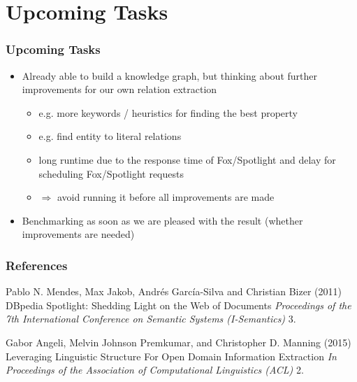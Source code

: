 \documentclass{beamer}
\begin{document}

\section{Upcoming Tasks}

\begin{frame}
\frametitle{Upcoming Tasks}
\begin{itemize}
	\item Already able to build a knowledge graph, but thinking about further improvements for our own relation extraction
	\begin{itemize}
		\item e.g. more keywords / heuristics for finding the best property
		\item e.g. find entity to literal relations 
		\item long runtime due to the response time of Fox/Spotlight and delay for scheduling Fox/Spotlight requests
		\item[] $\Rightarrow$ avoid running it before all improvements are made
	\end{itemize}
	\item Benchmarking as soon as we are pleased with the result (whether improvements are needed)
\end{itemize}
\end{frame}


\begin{frame}
\frametitle{References}
\footnotesize{
	\begin{thebibliography}{99} %
		 Pablo N. Mendes, Max Jakob, Andrés García-Silva and Christian Bizer (2011)
		\newblock DBpedia Spotlight: Shedding Light on the Web of
		Documents
		\newblock \emph{
			Proceedings of the 7th International Conference on Semantic Systems (I-Semantics) } 3.
	\end{thebibliography}
	\begin{thebibliography}{99} %
		 Gabor Angeli, Melvin Johnson Premkumar, and Christopher D. Manning (2015)
		\newblock Leveraging Linguistic Structure For Open Domain Information
		Extraction
		\newblock \emph{
			In Proceedings of the Association of Computational Linguistics (ACL) } 2.
	\end{thebibliography}
}
\end{frame}
\end{document}
